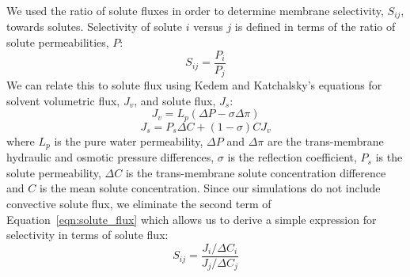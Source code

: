 \documentclass{article}
\begin{document}
  We used the ratio of solute fluxes in order to determine membrane selectivity, $S_{ij}$,
  towards solutes. Selectivity of solute $i$ versus $j$ is defined in terms of the
  ratio of solute permeabilities, $P$:~\cite{guo_pervaporation_2004}
  \begin{equation}
  S_{ij} = \frac{P_i}{P_j}
  \end{equation}
  We can relate this to solute flux using Kedem and Katchalsky's equations for 
  solvent volumetric flux, $J_v$, and solute flux, $J_s$:~\cite{kedem_permeability_1963,al-zoubi_rejection_2007}
  \begin{equation}
  J_v = L_p(\Delta P - \sigma\Delta \pi)
  \end{equation} 
  \begin{equation}
  J_s = P_s \Delta C + (1 - \sigma)CJ_v
  \label{eqn:solute_flux}
  \end{equation}
  where $L_p$ is the pure water permeability, $\Delta P$ and $\Delta \pi$ are the 
  trans-membrane hydraulic and osmotic pressure differences, $\sigma$ is the reflection
  coefficient, $P_s$ is the solute permeability, $\Delta C$ is the trans-membrane
  solute concentration difference and $C$ is the mean solute concentration. Since our
  simulations do not include convective solute flux, we eliminate the second term 
  of Equation~\ref{eqn:solute_flux} which allows us to derive a simple expression
  for selectivity in terms of solute flux:
  \begin{equation}
  S_{ij} = \frac{J_i / \Delta C_i}{J_j / \Delta C_j}
  \label{eqn:selectivity}
  \end{equation}
  
  
  
  
\end{document}
